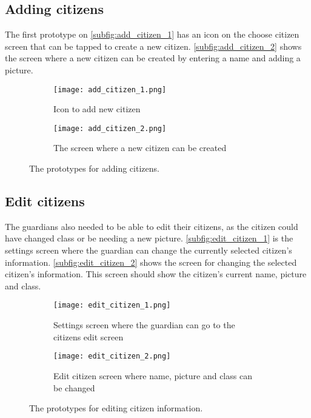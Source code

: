 \subsection{Adding citizens} 
The first prototype on \autoref{subfig:add_citizen_1} has an icon on the choose citizen screen that can be tapped to create a new citizen.
\autoref{subfig:add_citizen_2} shows the screen where a new citizen can be created by entering a name and adding a picture.
\begin{figure}[H]
    \begin{subfigure}{0.5\textwidth}
    \texttt{[image: add\_citizen\_1.png]}
    \caption{Icon to add new citizen}
    \label{subfig:add_citizen_1}
    \end{subfigure}
    \begin{subfigure}{0.5\textwidth}
        \texttt{[image: add\_citizen\_2.png]}
    \caption{The screen where a new citizen can be created}
    \label{subfig:add_citizen_2}
    \end{subfigure} 
    \caption{The prototypes for adding citizens.}
    \label{fig:add_citizen}
\end{figure}

\subsection{Edit citizens}
The guardians also needed to be able to edit their citizens, as the citizen could have changed class or be needing a new picture. 
\autoref{subfig:edit_citizen_1} is the settings screen where the guardian can change the currently selected citizen's information. 
\autoref{subfig:edit_citizen_2} shows the screen for changing the selected citizen's information.
This screen should show the citizen's current name, picture and class.
\begin{figure}[H]
    \begin{subfigure}{0.5\textwidth}
    \texttt{[image: edit\_citizen\_1.png]}
    \caption{Settings screen where the guardian can go to the citizens edit screen}
    \label{subfig:edit_citizen_1}
    \end{subfigure}
    \begin{subfigure}{0.5\textwidth}
        \texttt{[image: edit\_citizen\_2.png]}
    \caption{Edit citizen screen where name, picture and class can be changed}
    \label{subfig:edit_citizen_2}
    \end{subfigure} 
    \caption{The prototypes for editing citizen information.}
    \label{fig:edit_citizen}
\end{figure}
